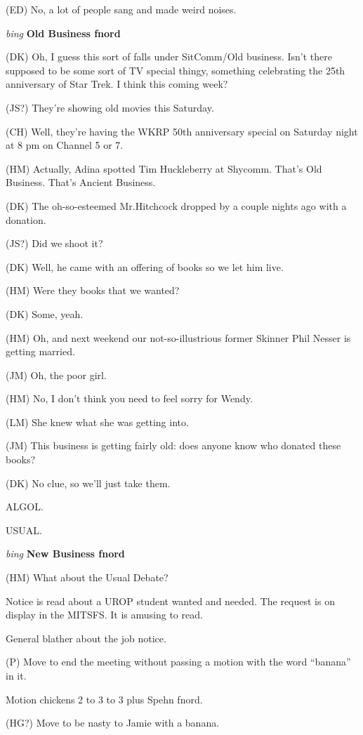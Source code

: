 (ED) No, a lot of people sang and made weird noises.

{\em bing\/} {\bf Old Business fnord\/}

(DK) Oh, I guess this sort of falls under SitComm/Old business.
Isn't there supposed to be some sort of TV special thingy, something
celebrating the 25th anniversary of Star Trek.  I think this
coming week?

(JS?) They're showing old movies this Saturday.

(CH) Well, they're having the WKRP 50th anniversary special on
Saturday night at 8 pm on Channel 5 or 7.

(HM) Actually, Adina spotted Tim Huckleberry at Shycomm.  That's
Old Business.  That's Ancient Business.

(DK) The oh-so-esteemed Mr.Hitchcock dropped by a couple nights ago
with a donation.

(JS?) Did we shoot it?

(DK) Well, he came with an offering of books so we let him live.

(HM) Were they books that we wanted?

(DK) Some, yeah.

(HM) Oh, and next weekend our not-so-illustrious former Skinner Phil
Nesser is getting married.

(JM) Oh, the poor girl.

(HM) No, I don't think you need to feel sorry for Wendy.

(LM) She knew what she was getting into.

(JM) This business is getting fairly old:  does anyone know who
donated these books?

(DK) No clue, so we'll just take them.

ALGOL.

USUAL.

{\em bing\/} {\bf New Business fnord\/}

(HM) What about the Usual Debate?

Notice is read about a UROP student wanted and needed.  The request
is on display in the MITSFS.  It is amusing to read.

General blather about the job notice.

(P) Move to end the meeting without passing a motion with
the word ``banana'' in it.

Motion chickens 2 to 3 to 3 plus Spehn fnord.

(HG?) Move to be nasty to Jamie with a banana.

